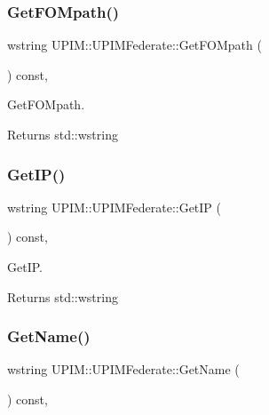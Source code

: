 \subsubsection{\texorpdfstring{Get\+F\+O\+Mpath()}{GetFOMpath()}}
{\footnotesize\ttfamily wstring U\+P\+I\+M\+::\+U\+P\+I\+M\+Federate\+::\+Get\+F\+O\+Mpath (\begin{DoxyParamCaption}{ }\end{DoxyParamCaption}) const\hspace{0.3cm}{\ttfamily [virtual]}, {\ttfamily [noexcept]}}



Get\+F\+O\+Mpath. 

\begin{DoxyReturn}{Returns}
std\+::wstring 
\end{DoxyReturn}
\mbox{\label{classUPIM_1_1UPIMFederate_a23eaa38785be58ea9c3538e171f1114f}} 
\subsubsection{\texorpdfstring{Get\+I\+P()}{GetIP()}}
{\footnotesize\ttfamily wstring U\+P\+I\+M\+::\+U\+P\+I\+M\+Federate\+::\+Get\+IP (\begin{DoxyParamCaption}{ }\end{DoxyParamCaption}) const\hspace{0.3cm}{\ttfamily [virtual]}, {\ttfamily [noexcept]}}



Get\+IP. 

\begin{DoxyReturn}{Returns}
std\+::wstring 
\end{DoxyReturn}
\mbox{\label{classUPIM_1_1UPIMFederate_a364723ba9d92457c6cef31ec9f1d970d}} 
\subsubsection{\texorpdfstring{Get\+Name()}{GetName()}}
{\footnotesize\ttfamily wstring U\+P\+I\+M\+::\+U\+P\+I\+M\+Federate\+::\+Get\+Name (\begin{DoxyParamCaption}{ }\end{DoxyParamCaption}) const\hspace{0.3cm}{\ttfamily [virtual]}, {\ttfamily [noexcept]}}




